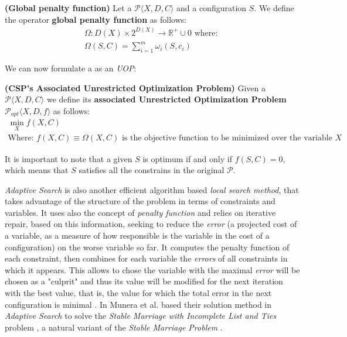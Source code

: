 \begin{definition}{\bf (Global penalty function)}
\label{def:global_cost}
Let a {\bf \csp} $\mathcal{P}\langle X,D,C \rangle$ and a configuration $S$. We define the operator {\bf global penalty function} as follows: 
\begin{equation*}
\begin{array}{l}
\Omega:D\left(X\right)\times 2^{D\left(X\right)}\rightarrow\mathbb{R}^+ \cup 0\text{ where: }\\
\Omega\left(S,C\right)=\displaystyle\sum_{i=1}^{m}{\omega_i\left(S,c_i\right)}
\end{array}
\end{equation*}
\end{definition}

We can now formulate a \CSP{} as an {\it UOP}:

\begin{definition}{\bf (CSP's Associated Unrestricted Optimization Problem)}
\label{def:ass_CSP}
Given a {\bf \csp} $\mathcal{P}\langle X,D,C \rangle$ we define its {\bf associated Unrestricted Optimization Problem} $\mathcal{P}_{opt}\langle X,D,f \rangle$ as follows: 
\begin{equation*}
\begin{array}{l}
\displaystyle\min_{X} f\left(X,C\right)\\
\text{Where:  } f\left(X,C\right) \equiv \Omega\left(X,C\right) \text{ is the objective function to be minimized over the variable } X
\end{array}
\end{equation*}
\end{definition}

It is important to note that a given $S$ is optimum if and only if $f\left(S,C\right) = 0$, which means that $S$ satisfies all the constrains in the original \csp{} $\mathcal{P}$.

{\it Adaptive Search} is also another efficient algorithm based \textit{local search method}, that takes advantage of the structure of the problem in terms of constraints and variables. It uses also the concept of \textit{penalty function} and relies on iterative repair, based on this information, seeking to reduce the \textit{error} (a projected cost of a variable, as a measure of how responsible is the variable in the cost of a configuration) on the worse variable so far. It computes the penalty function of each constraint, then combines for each variable the \textit{errors} of all constraints in which it appears. This allows to chose the variable with the maximal \textit{error} will be chosen as a "culprit" and thus its value will be modified for the next iteration with the best value, that is, the value for which the total error in the next configuration is minimal \cite{Diaz, Codognet2001, Caniou14}. In \cite{Munera2015} Munera et al. based their solution method in \textit{Adaptive Search} to solve the \textit{Stable Marriage with Incomplete List and Ties} problem \cite{Iwama1999}, a natural variant of the \textit{Stable Marriage Problem} \cite{Gale1962}.

